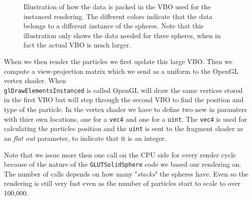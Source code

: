 \documentclass[a4paper]{article}
\begin{document}
\begin{figure}
\centering


\caption{Illustration of how the data is packed in the VBO used for the instanced rendering. 
The different colors indicate that the data belongs to a different instance of the spheres. 
Note that this illustration only shows the data needed for three spheres, when in fact the actual VBO is much larger.}
\label{instanced_figure}

\end{figure}

When we then render the particles we first update this large VBO. 
Then we compute a view-projection matrix which we send as a uniform to the OpenGL vertex shader. 
When\\ \verb|glDrawElementsInstanced| is called OpenGL will draw the same vertices stored in the first VBO but will step through the second VBO to find the position and type of the particle. 
In the vertex shader we have to define two new in paramters with thier own locations, one for a \verb|vec4| and one for a \verb|uint|. 
The \verb|vec4| is used for calculating the particles position and the \verb|uint| is sent to the fragment shader as an \emph{flat out} parameter, to indicate that it is an integer.  

Note that we issue more then one call on the CPU side for every render cycle because of the nature of the \verb|GLUTSolidSphere| code we based our rendering on.
The number of calls depends on how many "\emph{stacks}" the spheres have.
Even so the rendering is still very fast even as the number of particles start to scale to over 100,000. 
\end{document}
